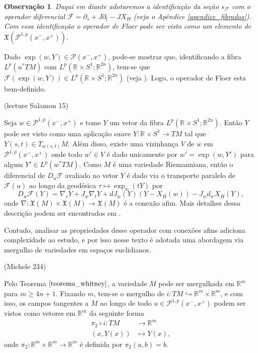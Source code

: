\documentclass[12pt]{book}
\newtheorem{observacao}[teorema]{Observação}
\newcommand{\caminhosexponenciaisconectantesabrev}{\mathcal{P}(x^{-},x^{+})}
\newcommand{\caminhosexponenciaisconectantes}[2]{\mathcal{P}^{1,p}(#1, #2)}
\newcommand{\caminhosexponenciaisconectantespadrao}{\caminhosexponenciaisconectantes{x^{-}}{x^{+}}}
\newcommand{\campohamiltonianoabrev}{X_{H}}
\newcommand{\campossuaves}[1]{\mathfrak{X}(#1)}
\newcommand{\circulo}{S^{1}}
\newcommand{\diferencialfloerponto}[1]{D_{#1}\operadorFloer}
\newcommand{\espacoLp}[1]{L^{p}(#1)}
\newcommand{\espacotangenteponto}[2]{T_{#1}#2}
\newcommand{\operadorFloer}{\mathcal{F}}
\newcommand{\operadorFloerParametro}[1]{\mathcal{F}(#1)}
\newcommand{\pullbackfibradotangente}[2]{#1^{*}T#2}
\newcommand{\pullbackfibradotangenteM}[1]{\pullbackfibradotangente{#1}{M}}
\newcommand{\retacartesianocirculo}{\real{} \times \circulo}
\newcommand{\real}[1]{\mathbb{R}^{#1}}
\newcommand{\aviso}[1]{{\color{violet}(#1)}}
\begin{document}
	\begin{observacao}
		Daqui em diante adotaremos a identificação da seção $s_{\operadorFloer}$ com o operador diferencial $\operadorFloer=\partial_{s}+J\partial_{t}-J\campohamiltonianoabrev$ (veja o Apêndice \ref{apendice_fibrados}). Com essa identificação o operador de Floer pode ser visto como um elemento de $\campossuaves{\caminhosexponenciaisconectantespadrao}$.
	\end{observacao}
	
	Dado $\exp(w,Y) \in \caminhosexponenciaisconectantesabrev$, pode-se mostrar que, identificando a fibra $\espacoLp{\pullbackfibradotangenteM{u}}$ com $\espacoLp{\retacartesianocirculo;\real{2n}}$, tem-se que $\operadorFloerParametro{\exp(w,Y)}\in \espacoLp{\retacartesianocirculo;\real{2n}}$ (veja \cite{audi_floer_homology}). Logo, o operador de Floer esta bem-definido.
	
	\aviso{lecture Salamon 15}
	
	Seja $w \in \caminhosexponenciaisconectantespadrao$ e tome $Y $ um vetor da fibra $ \espacoLp{\retacartesianocirculo;\real{2n}}$. Então $Y$ pode ser visto como uma aplicação suave $Y:\retacartesianocirculo\to TM$ tal que $Y(s,t)\in \espacotangenteponto{w(s,t)}{M}$. Além disso, existe uma vizinhança $V$ de $w$ em $\caminhosexponenciaisconectantespadrao$ onde todo $w' \in V$ é dado unicamente por $w'=\exp(w, Y')$ para algum $Y'\in \espacoLp{\pullbackfibradotangenteM{w}}$. Como $M$ é uma variedade Riemanniana, então o diferencial de $\diferencialfloerponto{u}$ avaliado no vetor $Y$ é dado via o transporte paralelo de $\operadorFloerParametro{u}$ ao longo da geodésica $\tau \mapsto \exp_{w}(tY)$ por 
	$$
	\diferencialfloerponto{w}(Y) = \nabla_{s}Y + J_{w}\nabla_{t}Y + dJ_{w}(Y)(Y - X_{H}(w)) - J_{w}d_{w}X_{H}(Y),
	$$
	onde $\nabla:\campossuaves{M}\times \campossuaves{M} \to \campossuaves{M}$ é a conexão afim. Mais detalhes dessa descrição podem ser encontrados em \cite{salamon_lecture}. 
	
	Contudo, analisar as propriedades desse operador com conexões afins adiciona complexidade ao estudo, e por isso nesse texto é adotada uma abordagem via mergulho de variedades em espaços euclidianos.
	
	\aviso{Michele 234}
	
	Pelo Teorema $\ref{teorema_whitney}$, a variedade $M$ pode ser mergulhada em $\real{m}$ para $m\geq 4n+1$. Fixando $m$, tem-se o mergulho de $i: TM \hookrightarrow \real{m}\times\real{m}$, e com isso, os campos tangentes a $M$ ao longo de todo $u \in \caminhosexponenciaisconectantespadrao$ podem ser vistos como vetores em $\real{m}$ da seguinte forma
	$$
	\begin{aligned}
	\pi_{2}\circ i : TM &\to \real{m}
	\\
	(x, Y(x)) &\mapsto Y(x),
	\end{aligned}
	$$
	onde $\pi_{2}:\real{m}\times \real{m}\to \real{m} 
	$ é definida por $\pi_{2}(a,b) = b$.
	
\end{document}
